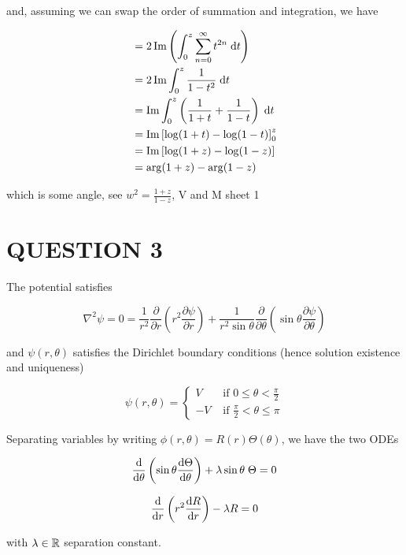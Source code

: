 \documentclass[a4paper]{article}
\begin{document}
and, assuming we can swap the order of summation and integration, we have 

\begin{align*}
& = 2 \operatorname{Im} \left( \int_{0}^{z} \sum_{n= 0}^{\infty} t^{2n} \; \mathrm{d} t \right) \\
& = 2 \operatorname{Im} \int_{0}^{z} \frac{1}{1-t^{2}} \; \mathrm{d} t \\
& = \operatorname{Im} \int_{0}^{z} \left(   \frac{1}{1+t} + \frac{1}{1-t}  \right)  \; \mathrm{d} t \\
& = \operatorname{Im} \left[  \log(1+t) - \log(1-t) \right]_{0}^{z} \\
& = \operatorname{Im} \left[  \log(1+z) - \log(1-z) \right] \\
& = \arg(1 + z) - \arg(1-z)
\end{align*}

which is some angle, see $ w^{2} = \frac{1+z}{1-z} $, V and M sheet 1










\section{QUESTION 3}


The potential satisfies

\[ \nabla^{2} \psi = 0 = \frac{1}{r^{2}} \frac{\partial }{\partial r} \left( r^{2}  \frac{\partial \psi }{\partial r} \right) + \frac{1}{r^{2} \sin \theta} \frac{\partial}{\partial \theta} \left(  \sin \theta \frac{\partial \psi }{\partial \theta} \right)     \]

and $ \psi(r,\theta) $ satisfies the Dirichlet boundary conditions (hence solution existence and uniqueness)

\[ \psi(r,\theta) = \begin{cases} V  & \text{ if } 0 \leq \theta < \frac{\pi}{2} \\ -V & \text{ if } \frac{\pi}{2} < \theta \leq \pi \end{cases} \]

Separating variables by writing $ \phi(r,\theta) = R(r) \Theta(\theta) $, we have the two ODEs


\[ \frac{\mathrm{d} }{\mathrm{d} \theta} \left(  \sin \theta \frac{\mathrm{d} \Theta}{\mathrm{d} \theta} \right) + \lambda \sin \theta \; \Theta = 0  \]

\[ \frac{\mathrm{d} }{\mathrm{d} r} \left(  r^{2} \frac{\mathrm{d} R}{\mathrm{d} r} \right) - \lambda R = 0   \]

with $ \lambda \in \mathbb{R} $ separation constant. 
\end{document}
